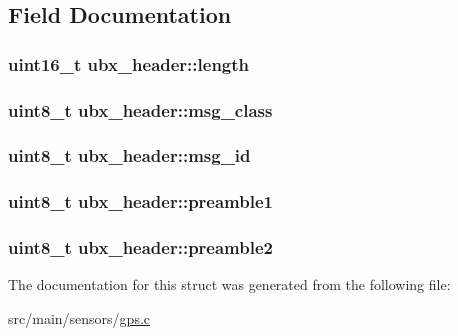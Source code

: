 \subsection{Field Documentation}
\hypertarget{structubx__header_af8a66cd98aee0b2b762852011942756f}{
\subsubsection[{length}]{\setlength{\rightskip}{0pt plus 5cm}uint16\+\_\+t ubx\+\_\+header\+::length}}\label{structubx__header_af8a66cd98aee0b2b762852011942756f}
\hypertarget{structubx__header_a8f7852ae57f29adf7a026891f7243802}{
\subsubsection[{msg\+\_\+class}]{\setlength{\rightskip}{0pt plus 5cm}uint8\+\_\+t ubx\+\_\+header\+::msg\+\_\+class}}\label{structubx__header_a8f7852ae57f29adf7a026891f7243802}
\hypertarget{structubx__header_a31aabe5f27b936dbd81f0669ce5a5ac9}{
\subsubsection[{msg\+\_\+id}]{\setlength{\rightskip}{0pt plus 5cm}uint8\+\_\+t ubx\+\_\+header\+::msg\+\_\+id}}\label{structubx__header_a31aabe5f27b936dbd81f0669ce5a5ac9}
\hypertarget{structubx__header_ae5d4d18b7e5a9c65734488ad41e5815e}{
\subsubsection[{preamble1}]{\setlength{\rightskip}{0pt plus 5cm}uint8\+\_\+t ubx\+\_\+header\+::preamble1}}\label{structubx__header_ae5d4d18b7e5a9c65734488ad41e5815e}
\hypertarget{structubx__header_a0b4e94fa8468acc5fc27bc28e406f7b8}{
\subsubsection[{preamble2}]{\setlength{\rightskip}{0pt plus 5cm}uint8\+\_\+t ubx\+\_\+header\+::preamble2}}\label{structubx__header_a0b4e94fa8468acc5fc27bc28e406f7b8}


The documentation for this struct was generated from the following file\+:\begin{DoxyCompactItemize}
\item 
src/main/sensors/\hyperlink{gps_8c}{gps.\+c}\end{DoxyCompactItemize}
